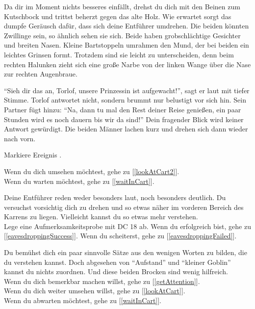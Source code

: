 Da dir im Moment nichts besseres einfällt, drehst du dich mit den Beinen zum Kutschbock und trittst beherzt gegen das alte Holz. Wie erwartet sorgt das dumpfe Geräusch dafür, dass sich deine Entführer umdrehen. Die beiden könnten Zwillinge sein, so ähnlich sehen sie sich. Beide haben grobschlächtige Gesichter und breiten Nasen. Kleine Bartstoppeln umrahmen den Mund, der bei beiden ein leichtes Grinsen formt. Trotzdem sind sie leicht zu unterscheiden, denn beim rechten Halunken zieht sich eine große Narbe von der linken Wange über die Nase zur rechten Augenbraue.

``Sieh dir das an, Torlof, unsere Prinzessin ist aufgewacht!'', sagt er laut mit tiefer Stimme. Torlof antwortet nicht, sondern brummt nur belustigt vor sich hin. Sein Partner fügt hinzu: ``Na, dann tu mal den Rest deiner Reise genießen, ein paar Stunden wird es noch dauern bis wir da sind!''
Dein fragender Blick wird keiner Antwort gewürdigt. Die beiden Männer lachen kurz und drehen sich dann wieder nach vorn.

Markiere Ereignis .

Wenn du dich umsehen möchtest, gehe zu [\ref{lookAtCart2}].
\\Wenn du warten möchtest, gehe zu [\ref{waitInCart}].


Deine Entführer reden weder besonders laut, noch besonders deutlich. Du versuchst vorsichtig dich zu drehen und so etwas näher im vorderen Bereich des Karrens zu liegen. Vielleicht kannst du so etwas mehr verstehen.
\\Lege eine Aufmerksamkeitsprobe mit DC 18 ab. Wenn du erfolgreich bist, gehe zu [\ref{eavesdroppingSuccess}].
Wenn du scheiterst, gehe zu [\ref{eavesdroppingFailed}].


Du bemühst dich ein paar sinnvolle Sätze aus den wenigen Worten zu bilden, die du verstehen kannst. Doch abgesehen von ``Aufstand'' und ``kleiner Goblin'' kannst du nichts zuordnen. Und diese beiden Brocken sind wenig hilfreich.
\\Wenn du dich bemerkbar machen willst, gehe zu [\ref{getAttention}].
\\Wenn du dich weiter umsehen willst, gehe zu [\ref{lookAtCart}].
\\Wenn du abwarten möchtest, gehe zu [\ref{waitInCart}].


